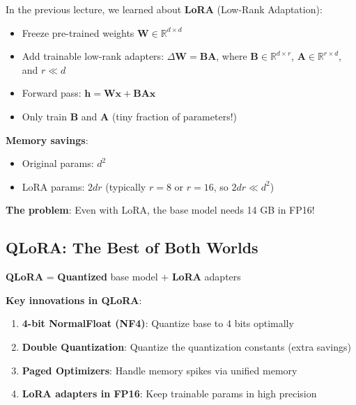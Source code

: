 \documentclass{article}
\begin{document}
In the previous lecture, we learned about \textbf{LoRA} (Low-Rank Adaptation):

\begin{itemize}
\item Freeze pre-trained weights $\mathbf{W} \in \mathbb{R}^{d \times d}$
\item Add trainable low-rank adapters: $\Delta \mathbf{W} = \mathbf{B}\mathbf{A}$, where $\mathbf{B} \in \mathbb{R}^{d \times r}$, $\mathbf{A} \in \mathbb{R}^{r \times d}$, and $r \ll d$
\item Forward pass: $\mathbf{h} = \mathbf{W}\mathbf{x} + \mathbf{B}\mathbf{A}\mathbf{x}$
\item Only train $\mathbf{B}$ and $\mathbf{A}$ (tiny fraction of parameters!)
\end{itemize}

\textbf{Memory savings}:
\begin{itemize}
\item Original params: $d^2$
\item LoRA params: $2dr$ (typically $r=8$ or $r=16$, so $2dr \ll d^2$)
\end{itemize}

\textbf{The problem}: Even with LoRA, the base model needs 14 GB in FP16!

\subsection{QLoRA: The Best of Both Worlds}

\textbf{QLoRA} = \textbf{Quantized} base model + \textbf{LoRA} adapters

\begin{center}
\end{center}

\textbf{Key innovations in QLoRA}:

\begin{enumerate}
\item \textbf{4-bit NormalFloat (NF4)}: Quantize base to 4 bits optimally
\item \textbf{Double Quantization}: Quantize the quantization constants (extra savings)
\item \textbf{Paged Optimizers}: Handle memory spikes via unified memory
\item \textbf{LoRA adapters in FP16}: Keep trainable params in high precision
\end{enumerate}
\end{document}
